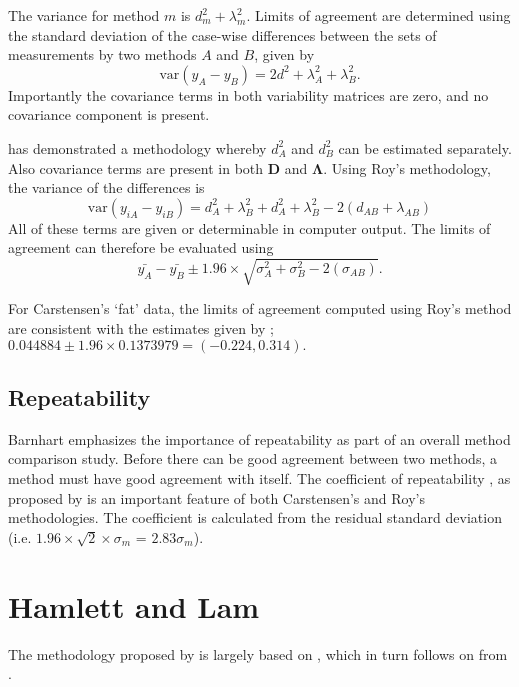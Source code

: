 \documentclass[12pt, a4paper]{report}
\theoremstyle{plain}
\theoremstyle{definition}
\theoremstyle{remark}
\begin{document}
The variance for method $m$ is $d^2_{m}+\lambda^2_{m}$. Limits of agreement are determined using the standard deviation of the case-wise differences between the sets of measurements by two methods $A$ and $B$, given by
\begin{equation}
\mbox{var} (y_{A}-y_{B}) = 2d^2 + \lambda^2_{A}+ \lambda^2_{B}.
\end{equation}
Importantly the covariance terms in both variability matrices are zero, and no covariance component is present.


\citet{roy} has demonstrated a methodology whereby $d^2_{A}$ and $d^2_{B}$ can be estimated separately. Also covariance terms are present in both $\boldsymbol{D}$ and $\boldsymbol{\Lambda}$. Using Roy's methodology, the variance of the differences is
\begin{equation}
\mbox{var} (y_{iA}-y_{iB})= d^2_{A} + \lambda^2_{B} + d^2_{A} + \lambda^2_{B} - 2(d_{AB} + \lambda_{AB})
\end{equation}
All of these terms are given or determinable in computer output.
The limits of agreement can therefore be evaluated using
\begin{equation}
\bar{y_{A}}-\bar{y_{B}} \pm 1.96 \times \sqrt{ \sigma^2_{A} + \sigma^2_{B}  - 2(\sigma_{AB})}.
\end{equation}

For Carstensen's `fat' data, the limits of agreement computed using Roy's
method are consistent with the estimates given by \citet{BXC2008}; $0.044884  \pm 1.96 \times  0.1373979 = (-0.224,  0.314).$


\newpage

\subsection{Repeatability}
Barnhart emphasizes the importance of repeatability as part of an overall method comparison study. Before there can be good agreement between two methods, a method must have good agreement with itself. The coefficient of repeatability , as proposed by \citet{BA99} is an important feature of both Carstensen's and Roy's methodologies. The coefficient is calculated from the residual standard deviation (i.e. $1.96 \times \sqrt{2} \times \sigma_m$ = $2.83 \sigma_m$).

\newpage
\section{Hamlett and Lam}
The methodology proposed by \citet{Roy2009} is largely based on \citet{hamlett}, which in turn follows on from \citet{lam}.
\end{document}
